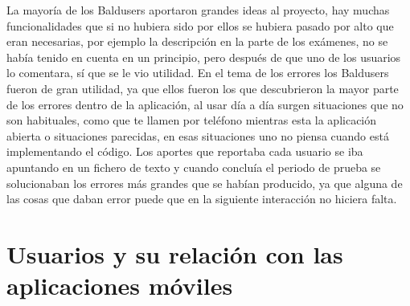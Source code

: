 La mayoría de los Baldusers aportaron grandes ideas al proyecto, hay muchas funcionalidades que si no hubiera sido por ellos se hubiera pasado por alto que eran necesarias, por ejemplo la descripción en la parte de los exámenes, no se había tenido en cuenta en un principio, pero después de que uno de los usuarios lo comentara, sí que se le vio utilidad.
En el tema de los errores los Baldusers fueron de gran utilidad, ya que ellos fueron los que descubrieron la mayor parte de los errores dentro de la aplicación, al usar día a día surgen situaciones que no son habituales, como que te llamen por teléfono mientras esta la aplicación abierta o situaciones parecidas, en esas situaciones uno no piensa cuando está implementando el código.
Los aportes que reportaba cada usuario se iba apuntando en un fichero de texto y cuando concluía el periodo de prueba se solucionaban los errores más grandes que se habían producido, ya que alguna de las cosas que daban error puede que en la siguiente interacción no hiciera falta.

\section{Usuarios y su relación con las aplicaciones móviles}
\label{secc:usuarios y su relación con las aplicaciones móviles}

